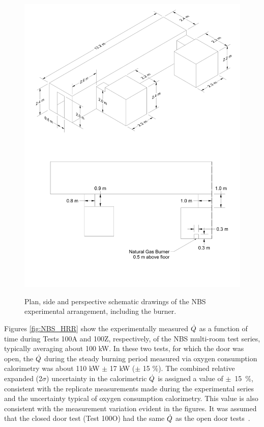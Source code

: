 \begin{figure}[\figoptions{t}]
\begin{center}
\includegraphics[width=6.5in]{FIGURES/NBS/NBS_Drawing}\\
\end{center}
\caption{Plan, side and perspective schematic drawings of the NBS experimental arrangement, including the burner.}
 \label{fig:NBS_Detailed}
\end{figure}

Figures \ref{fig:NBS_HRR} show the experimentally measured $\dot{Q}$ as a function of time during Tests 100A and 100Z, respectively, of the NBS multi-room test series, typically averaging about 100 kW.  In these two tests, for which the door was open, the $\dot{Q}$ during the steady burning period measured via oxygen consumption calorimetry was about 110 kW $\pm$ 17 kW ($\pm$ 15 \%). The combined relative expanded (2$\sigma$) uncertainty in the calorimetric  $\dot{Q}$ is assigned a value of $\pm$~15~\%, consistent with the replicate measurements made during the experimental series and the uncertainty typical of oxygen consumption calorimetry. This value is also consistent with the measurement variation evident in the figures.  It was assumed that the closed door test (Test 100O) had the same $\dot{Q}$ as the open door tests~\cite{NRCNUREG1824}.

